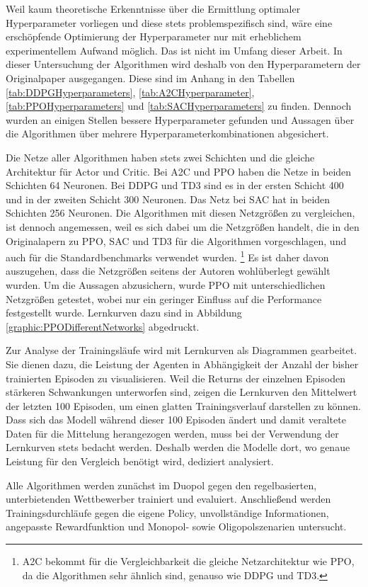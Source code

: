 Weil kaum theoretische Erkenntnisse über die Ermittlung optimaler Hyperparameter vorliegen und diese stets problemspezifisch sind, wäre eine erschöpfende Optimierung der Hyperparameter nur mit erheblichem experimentellem Aufwand möglich.
Das ist nicht im Umfang dieser Arbeit.
In dieser Untersuchung der Algorithmen wird deshalb von den Hyperparametern der Originalpaper ausgegangen.
Diese sind im Anhang in den Tabellen \ref{tab:DDPGHyperparameters}, \ref{tab:A2CHyperparameter}, \ref{tab:PPOHyperparameters} und \ref{tab:SACHyperparameters} zu finden.
Dennoch wurden an einigen Stellen bessere Hyperparameter gefunden und Aussagen über die Algorithmen über mehrere Hyperparameterkombinationen abgesichert.

Die Netze aller Algorithmen haben stets zwei Schichten und die gleiche Architektur für Actor und Critic.
Bei A2C und PPO haben die Netze in beiden Schichten 64 Neuronen.
Bei DDPG und TD3 sind es in der ersten Schicht 400 und in der zweiten Schicht 300 Neuronen.
Das Netz bei SAC hat in beiden Schichten 256 Neuronen.
Die Algorithmen mit diesen Netzgrößen zu vergleichen, ist dennoch angemessen, weil es sich dabei um die Netzgrößen handelt, die in den Originalapern zu PPO, SAC und TD3 für die Algorithmen vorgeschlagen, und auch für die Standardbenchmarks verwendet wurden. \footnote{A2C bekommt für die Vergleichbarkeit die gleiche Netzarchitektur wie PPO, da die Algorithmen sehr ähnlich sind, genauso wie DDPG und TD3.}
Es ist daher davon auszugehen, dass die Netzgrößen seitens der Autoren wohlüberlegt gewählt wurden.
Um die Aussagen abzusichern, wurde PPO mit unterschiedlichen Netzgrößen getestet, wobei nur ein geringer Einfluss auf die Performance festgestellt wurde.
Lernkurven dazu sind in Abbildung \ref{graphic:PPODifferentNetworks} abgedruckt.

Zur Analyse der Trainingsläufe wird mit Lernkurven als Diagrammen gearbeitet.
Sie dienen dazu, die Leistung der Agenten in Abhängigkeit der Anzahl der bisher trainierten Episoden zu visualisieren.
Weil die Returns der einzelnen Episoden stärkeren Schwankungen unterworfen sind, zeigen die Lernkurven den Mittelwert der letzten 100 Episoden, um einen glatten Trainingsverlauf darstellen zu können.
Dass sich das Modell während dieser 100 Episoden ändert und damit veraltete Daten für die Mittelung herangezogen werden, muss bei der Verwendung der Lernkurven stets bedacht werden.
Deshalb werden die Modelle dort, wo genaue Leistung für den Vergleich benötigt wird, dediziert analysiert.

Alle Algorithmen werden zunächst im Duopol gegen den regelbasierten, unterbietenden Wettbewerber trainiert und evaluiert.
Anschließend werden Trainingsdurchläufe gegen die eigene Policy, unvollständige Informationen, angepasste Rewardfunktion und Monopol- sowie Oligopolszenarien untersucht.

